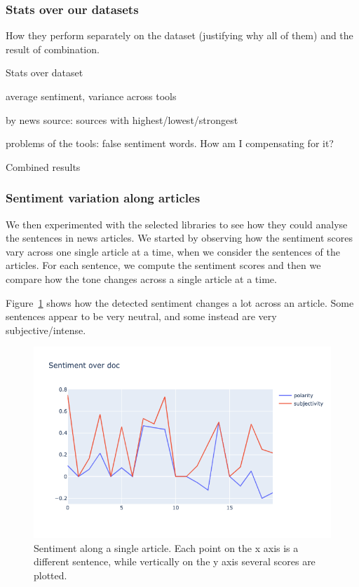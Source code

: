\subsubsection{\statusred Stats over our datasets}

How they perform separately on the dataset (justifying why all of them) and the result of combination.


Stats over dataset


average sentiment, variance across tools

by news source: sources with highest/lowest/strongest

problems of the tools: false sentiment words. How am I compensating for it?

Combined results


\subsubsection{\statusorange Sentiment variation along articles}

We then experimented with the selected libraries to see how they could analyse the sentences in news articles. We started by observing how the sentiment scores vary across one single article at a time, when we consider the sentences of the articles. For each sentence, we compute the sentiment scores and then we compare how the tone changes across a single article at a time.

Figure~\ref{fig:sentiment_across_one_article} shows how the detected sentiment changes a lot across an article.
Some sentences appear to be very neutral, and some instead are very subjective/intense.

\begin{figure}[!htbp]
    \centering
    \includegraphics[width=\linewidth]{figures/sentiment_across_article.png}
    \caption{Sentiment along a single article. Each point on the x axis is a different sentence, while vertically on the y axis several scores are plotted.}
    \label{fig:sentiment_across_one_article}
\end{figure}

